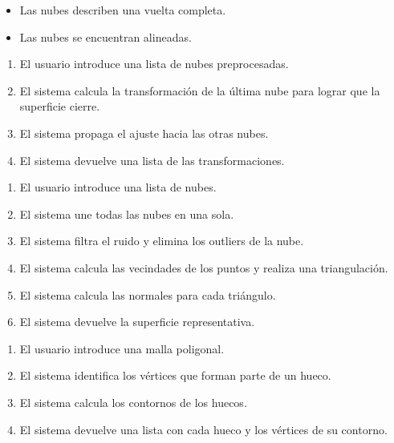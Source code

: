 		\begin{itemize}
			\item Las nubes describen una vuelta completa.
			\item Las nubes se encuentran alineadas.
		\end{itemize}
		\CUNormal
		\begin{enumerate}
			\item El usuario introduce una lista de nubes preprocesadas. 
			\item El sistema calcula la transformación de la última nube para lograr que la superficie cierre. 
			\item El sistema propaga el ajuste hacia las otras nubes.
			\item El sistema devuelve una lista de las transformaciones.
		\end{enumerate}


		\CUNormal
		\begin{enumerate}
			\item El usuario introduce una lista de nubes.
			\item El sistema une todas las nubes en una sola.
			\item El sistema filtra el ruido y elimina los outliers de la nube.
			\item El sistema calcula las vecindades de los puntos y realiza una triangulación.
			\item El sistema calcula las normales para cada triángulo.
			\item El sistema devuelve la superficie representativa.
		\end{enumerate}

		\CUNormal
		\begin{enumerate}
			\item El usuario introduce una malla poligonal.
			\item El sistema identifica los vértices que forman parte de un hueco.
			\item El sistema calcula los contornos de los huecos.
			\item El sistema devuelve una lista con cada hueco y los vértices de su contorno.
		\end{enumerate}

